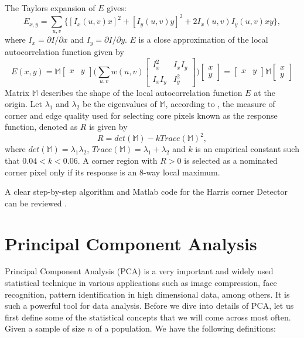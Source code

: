 \documentclass[10pt,a4paper]{article}
\begin{document}
      The Taylors expansion of $E$ gives:
      \begin{equation}
      E_{x,y} = \sum_{u,v} \{[I_x (u,v)x]^2 + [I_y(u,v)y]^2 + 2I_x(u,v)I_y (u,v)xy\},
      \end{equation}  
      where $I_x = \partial I / \partial x$ and $I_y = \partial I /\partial y$. $E$ is a close approximation of the local autocorrelation function given by
      \begin{equation}
      E(x,y) = \mathbb{M}\begin{bmatrix}
      x & y
      \end{bmatrix} \Bigg(\sum_{u,v} w(u,v)  
       \begin{bmatrix}
       I_x ^2 & I_x I_y  \\
       I_xI_y & I_y ^2
       \end{bmatrix}  \Bigg)\begin{bmatrix}
      x \\
      y
      \end{bmatrix}  = \begin{bmatrix}
      x & y
      \end{bmatrix} \mathbb{M}\begin{bmatrix}
      x \\
      y
      \end{bmatrix}
      \end{equation}
      Matrix $\mathbb{M}$ describes the shape of the local autocorrelation function $E$ at the origin.
      Let $\lambda_1$ and $\lambda_2$ be the eigenvalues of $\mathbb{M}$, according to \citep{harris1988combined}, the measure of corner and edge quality used for selecting core pixels known as the response function, denoted as $R$ is given by
      \begin{equation}
      R = det(\mathbb{M}) - kTrace(\mathbb{M})^2,
      \end{equation}       
      where $det(\mathbb{M})=\lambda_1 \lambda_2$, $Trace(\mathbb{M}) = \lambda_1+ \lambda_2$ and $k$ is an empirical constant such that $0.04 <k < 0.06$.
      A corner region with $R>0$ is selected as a nominated corner pixel only if its response is an $8$-way local maximum.
      
      A clear step-by-step algorithm and Matlab code for the Harris corner Detector can be reviewed \citep{stoica2011delaunay}.
      
      
     \section{Principal Component Analysis}
	  Principal Component Analysis (PCA) is a very important and widely used statistical technique in various applications such as image compression, face recognition, pattern identification in high dimensional data, among others. It is such a powerful tool for data analysis. Before we dive into details of PCA, let us first define some of the statistical concepts that we will come across most often. Given a sample of size $n$ of a population. We have the following definitions:
	  
\end{document}
